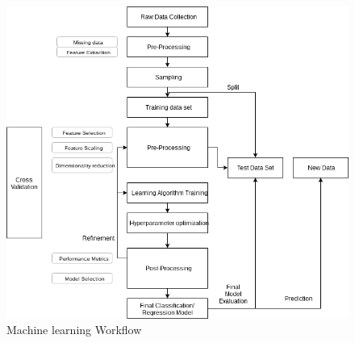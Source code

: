     
    \begin{figure}[!h]
    	\centering
    	\includegraphics[width=1\linewidth]{thesis_template/images/machine_learning_workflow.png}
    	\caption{Machine learning Workflow}
    	\label{fig:machine_learning_workflow}
    \end{figure}
    
